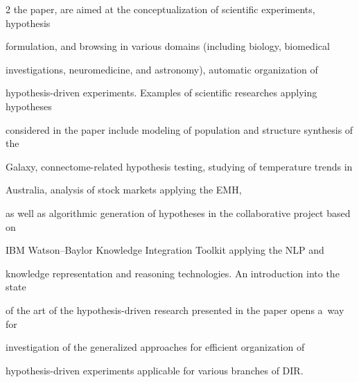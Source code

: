\begin{multicols}{2}
the paper, are aimed at the conceptualization of scientific experiments, hypothesis


formulation, and browsing in various domains (including biology, biomedical


investigations, neuromedicine, and astronomy), automatic organization of


hypothesis-driven   experiments. Examples of scientific researches applying hypotheses


considered in the paper include modeling of population and structure synthesis of the


Galaxy, connectome-related hypothesis testing,  studying of temperature trends in


Australia, analysis of stock markets applying the EMH,


as well as algorithmic generation of hypotheses in the collaborative project based on


IBM Watson--Baylor Knowledge Integration Toolkit applying the NLP and


knowledge representation and reasoning technologies. An introduction into the state


of the art of the hypothesis-driven research presented in the paper opens a~way for


investigation of the generalized approaches for efficient organization of


hypothesis-driven experiments applicable for various branches of DIR.





\renewcommand{\bibname}{\protect\rmfamily References}





\vspace*{-6pt}





{\small\frenchspacing


{%


}}
\end{multicols}
